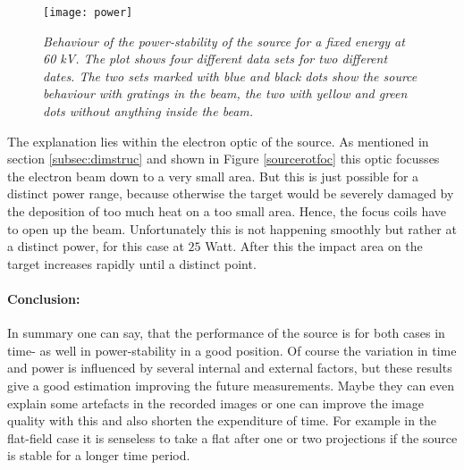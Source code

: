 \begin{figure}%
	\begin{center}
		\texttt{[image: power]}
	\end{center}
	\caption[Power-stability of the source with fixed energy to 60 kV]{\textit{Behaviour of the power-stability of the source for a fixed energy at 60 kV. The plot shows four different data sets for two different dates. The two sets marked with blue and black dots show the source behaviour with gratings in the beam, the two with yellow and green dots without anything inside the beam. }}
	\label{powerdep}
\end{figure}
The explanation lies within the electron optic of the source. As mentioned in section \ref{subsec:dimstruc} and shown in Figure \ref{sourcerotfoc} this optic focusses the electron beam down to a very small area. But this is just possible for a distinct power range, because otherwise the target would be severely damaged by the deposition of too much heat on a too small area. Hence, the focus coils have to open up the beam. Unfortunately this is not happening smoothly but rather at a distinct power, for this case at $25$ Watt. After this the impact area on the target increases rapidly until a distinct point. 

\paragraph{Conclusion:}
In summary one can say, that the performance of the source is for both cases in time- as well in power-stability in a good position. Of course the variation in time and power is influenced by several internal and external factors, but these results give a good estimation improving the future measurements. Maybe they can even explain some artefacts in the recorded images or one can improve the image quality with this and also shorten the expenditure of time. For example in the flat-field case it is senseless to take a \gls{flat} after one or two projections if the source is stable for a longer time period.   
